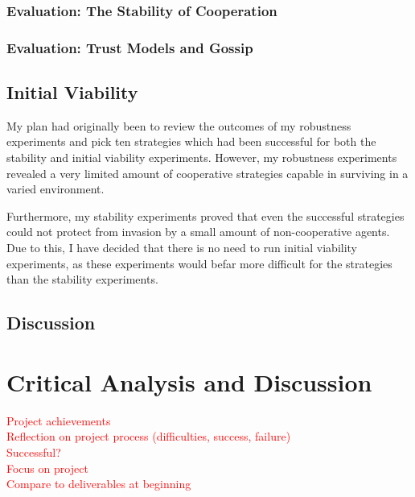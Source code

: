 \documentclass[]{final_report}
\begin{document}
\subsection{Evaluation: The Stability of Cooperation}


\subsection{Evaluation: Trust Models and Gossip}

\section{Initial Viability}
My plan had originally been to review the outcomes of my robustness experiments and pick ten strategies which had been successful for both the stability and initial viability experiments. However, my robustness experiments revealed a very limited amount of cooperative strategies capable in surviving in a varied environment.\par Furthermore, my stability experiments proved that even the successful strategies could not protect from invasion by a small amount of non-cooperative agents. Due to this, I have decided that there is no need to run initial viability experiments, as these experiments would befar more difficult for the strategies than the stability experiments.

\section{Discussion}

\chapter{Critical Analysis and Discussion}
\textcolor{red}{Project achievements\\
Reflection on project process (difficulties, success, failure)\\
Successful?\\
Focus on project\\
Compare to deliverables at beginning\\
}
\end{document}
